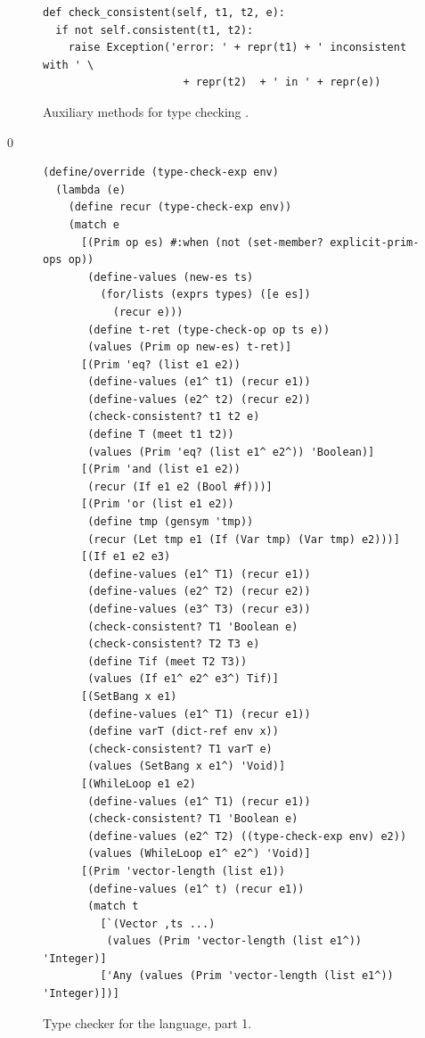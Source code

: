 \documentclass[7x10]{TimesAPriori_MIT}%
\def\racketEd{0}
\def\edition{1}
\numberwithin{theorem}{chapter}
\numberwithin{definition}{chapter}
\numberwithin{equation}{chapter}
\begin{document}
{\begin{figure}[tbp]
\begin{tcolorbox}[colback=white]
\begin{lstlisting}
def check_consistent(self, t1, t2, e):
  if not self.consistent(t1, t2):
    raise Exception('error: ' + repr(t1) + ' inconsistent with ' \
                      + repr(t2)  + ' in ' + repr(e))
\end{lstlisting}
\end{tcolorbox}

\caption{Auxiliary methods for type checking \LangGrad{}.}
\label{fig:type-check-Lgradual-aux}
\end{figure}

\fi}


{\if\edition\racketEd        
\begin{figure}[tbp]
\begin{tcolorbox}[colback=white]  
\begin{lstlisting}[basicstyle=\ttfamily\footnotesize]
(define/override (type-check-exp env)
  (lambda (e)
    (define recur (type-check-exp env))
    (match e
      [(Prim op es) #:when (not (set-member? explicit-prim-ops op))
       (define-values (new-es ts)
         (for/lists (exprs types) ([e es])
           (recur e)))
       (define t-ret (type-check-op op ts e))
       (values (Prim op new-es) t-ret)]
      [(Prim 'eq? (list e1 e2))
       (define-values (e1^ t1) (recur e1))
       (define-values (e2^ t2) (recur e2))
       (check-consistent? t1 t2 e)
       (define T (meet t1 t2))
       (values (Prim 'eq? (list e1^ e2^)) 'Boolean)]
      [(Prim 'and (list e1 e2))
       (recur (If e1 e2 (Bool #f)))]
      [(Prim 'or (list e1 e2))
       (define tmp (gensym 'tmp))
       (recur (Let tmp e1 (If (Var tmp) (Var tmp) e2)))]
      [(If e1 e2 e3)
       (define-values (e1^ T1) (recur e1))
       (define-values (e2^ T2) (recur e2))
       (define-values (e3^ T3) (recur e3))
       (check-consistent? T1 'Boolean e)
       (check-consistent? T2 T3 e)
       (define Tif (meet T2 T3))
       (values (If e1^ e2^ e3^) Tif)]
      [(SetBang x e1)
       (define-values (e1^ T1) (recur e1))
       (define varT (dict-ref env x))
       (check-consistent? T1 varT e)
       (values (SetBang x e1^) 'Void)]
      [(WhileLoop e1 e2)
       (define-values (e1^ T1) (recur e1))
       (check-consistent? T1 'Boolean e)
       (define-values (e2^ T2) ((type-check-exp env) e2))
       (values (WhileLoop e1^ e2^) 'Void)]
      [(Prim 'vector-length (list e1))
       (define-values (e1^ t) (recur e1))
       (match t
         [`(Vector ,ts ...)
          (values (Prim 'vector-length (list e1^)) 'Integer)]
         ['Any (values (Prim 'vector-length (list e1^)) 'Integer)])]
\end{lstlisting}
\end{tcolorbox}
\caption{Type checker for the \LangGrad{} language, part 1.}
\label{fig:type-check-Lgradual-1}
\end{figure}

}
\end{document}
